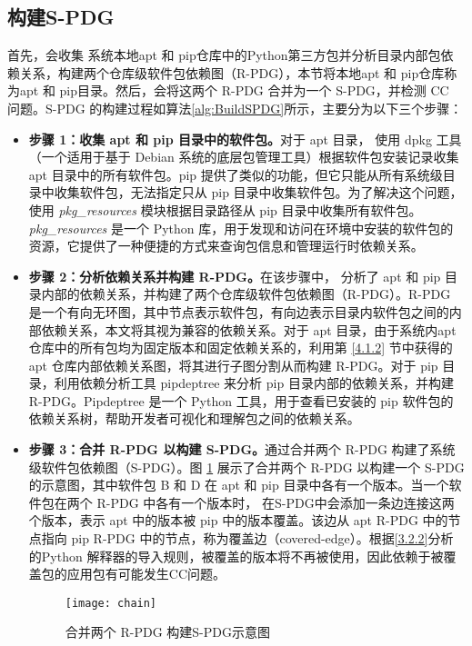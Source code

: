 \subsection{构建S-PDG}\label{4.2.1}
首先，\tool{}会收集 系统本地apt 和 pip仓库中的Python第三方包并分析目录内部包依赖关系，构建两个仓库级软件包依赖图（R-PDG），本节将本地apt 和 pip仓库称为apt 和 pip目录。然后，\tool{}会将这两个 R-PDG 合并为一个 S-PDG，并检测 CC 问题。S-PDG 的构建过程如算法\ref{alg:BuildSPDG}所示，主要分为以下三个步骤：

\begin{itemize}
	\item \textbf{步骤 1：收集 apt 和 pip 目录中的软件包。}对于 apt 目录，\tool{} 使用 dpkg  工具（一个适用于基于 Debian 系统的底层包管理工具）根据软件包安装记录收集 apt 目录中的所有软件包。pip 提供了类似的功能，但它只能从所有系统级目录中收集软件包，无法指定只从 pip 目录中收集软件包。为了解决这个问题，\tool{} 使用 \textit{pkg\_resources} 模块根据目录路径从 pip 目录中收集所有软件包。\textit{pkg\_resources} 是一个 Python 库，用于发现和访问在环境中安装的软件包的资源，它提供了一种便捷的方式来查询包信息和管理运行时依赖关系。
	\item \textbf{步骤 2：分析依赖关系并构建 R-PDG。}在该步骤中，\tool{} 分析了 apt 和 pip 目录内部的依赖关系，并构建了两个仓库级软件包依赖图（R-PDG）。R-PDG 是一个有向无环图，其中节点表示软件包，有向边表示目录内软件包之间的内部依赖关系，本文将其视为兼容的依赖关系。对于 apt 目录，由于系统内apt仓库中的所有包均为固定版本和固定依赖关系的，\tool{}利用第 \ref{4.1.2} 节中获得的 apt 仓库内部依赖关系图，将其进行子图分割从而构建 R-PDG。对于 pip 目录，\tool{}利用依赖分析工具 pipdeptree  来分析 pip 目录内部的依赖关系，并构建 R-PDG。Pipdeptree 是一个 Python 工具，用于查看已安装的 pip 软件包的依赖关系树，帮助开发者可视化和理解包之间的依赖关系。
	\item \textbf{步骤 3：合并 R-PDG 以构建 S-PDG。}\tool{}通过合并两个 R-PDG 构建了系统级软件包依赖图（S-PDG）。图 \ref{fig:PDG} 展示了合并两个 R-PDG 以构建一个 S-PDG 的示意图，其中软件包 B 和 D 在 apt 和 pip 目录中各有一个版本。当一个软件包在两个 R-PDG 中各有一个版本时，\tool{} 在S-PDG中会添加一条边连接这两个版本，表示 apt 中的版本被 pip 中的版本覆盖。该边从 apt R-PDG 中的节点指向 pip R-PDG 中的节点，称为覆盖边（covered-edge）。根据\ref{3.2.2}分析的Python 解释器的导入规则，被覆盖的版本将不再被使用，因此依赖于被覆盖包的应用包有可能发生CC问题。
	\begin{figure}[t] %
		\centering
		\texttt{[image: chain]}
		\caption{合并两个 R-PDG 构建S-PDG示意图}
		\label{fig:PDG}
	\end{figure}
	
\end{itemize}
